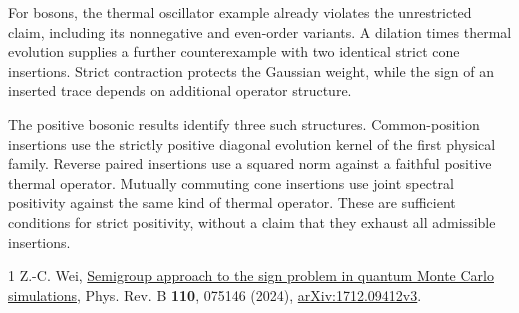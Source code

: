 \documentclass[11pt,a4paper]{article}
\theoremstyle{remark}
\numberwithin{equation}{section}
\begin{document}
For bosons, the thermal oscillator example already violates the unrestricted
claim, including its nonnegative and even-order variants. A dilation times
thermal evolution supplies a further counterexample with two identical
strict cone insertions. Strict contraction protects the Gaussian weight,
while the sign of an inserted trace depends on additional operator
structure.

The positive bosonic results identify three such structures. Common-position
insertions use the strictly positive diagonal evolution kernel of the first
physical family. Reverse paired insertions use a squared norm against a
faithful positive thermal operator. Mutually commuting cone insertions use
joint spectral positivity against the same kind of thermal operator. These
are sufficient conditions for strict positivity, without a claim that they
exhaust all admissible insertions.

\begin{thebibliography}{1}
Z.-C. Wei,
\href{https://doi.org/10.1103/PhysRevB.110.075146}{Semigroup approach to the
sign problem in quantum Monte Carlo simulations},
Phys. Rev. B \textbf{110}, 075146 (2024),
\href{https://arxiv.org/abs/1712.09412v3}{arXiv:1712.09412v3}.
\end{thebibliography}
\end{document}
